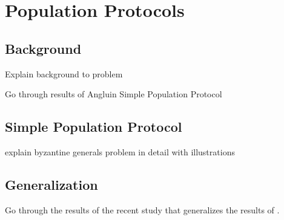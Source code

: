 \section{Population Protocols}
\subsection{Background}
Explain background to problem

Go through results of Angluin Simple Population Protocol \cite{angluinSimplePopulationProtocol2008}

\subsection{Simple Population Protocol}
explain byzantine generals problem in detail with illustrations

\subsection{Generalization}

Go through the results of the recent study that generalizes the results of \cite{angluinSimplePopulationProtocol2008}. \cite{aspnesFastConverganceOfKOpinion2023}

\clearpage